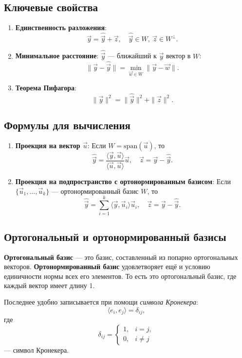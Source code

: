 \documentclass[12pt]{article}
\begin{document}
\subsection*{Ключевые свойства}
\begin{enumerate}
    \item \textbf{Единственность разложения}:  
    $$
    \vec{y} = \hat{\vec{y}} + \vec{z}, \quad \hat{\vec{y}} \in W, \ \vec{z} \in W^\perp.
    $$
    
    \item \textbf{Минимальное расстояние}:  
    $\hat{\vec{y}}$ — ближайший к $\vec{y}$ вектор в $W$:  
    $$
    \|\vec{y} - \hat{\vec{y}}\| = \min_{\vec{w} \in W} \|\vec{y} - \vec{w}\|.
    $$
    
    \item \textbf{Теорема Пифагора}:  
    $$
    \|\vec{y}\|^2 = \|\hat{\vec{y}}\|^2 + \|\vec{z}\|^2.
    $$
\end{enumerate}

\subsection*{Формулы для вычисления}
\begin{enumerate}
    \item \textbf{Проекция на вектор $\vec{u}$}:  
    Если $W = \mathrm{span}(\vec{u})$, то  
    $$
    \hat{\vec{y}} = \frac{\langle \vec{y}, \vec{u} \rangle}{\langle \vec{u}, \vec{u} \rangle} \vec{u}, \quad \vec{z} = \vec{y} - \hat{\vec{y}}.
    $$
    
    \item \textbf{Проекция на подпространство с ортонормированным базисом}:  
    Если $\{\vec{u}_1, \dots, \vec{u}_k\}$ — ортонормированный базис $W$, то  
    $$
    \hat{\vec{y}} = \sum_{i=1}^k \langle \vec{y}, \vec{u}_i \rangle \vec{u}_i, \quad \vec{z} = \vec{y} - \hat{\vec{y}}.
    $$
\end{enumerate}

\subsection*{Ортогональный и ортонормированный базисы}
\textbf{Ортогональный базис} — это базис, составленный из попарно ортогональных векторов.  
\textbf{Ортонормированный базис} удовлетворяет ещё и условию единичности нормы всех его элементов. То есть это ортогональный базис, где каждый вектор имеет длину 1.

Последнее удобно записывается при помощи \textit{символа Кронекера}:
$$
\langle e_i, e_j \rangle = \delta_{ij},
$$
где  
$$
\delta_{ij} = 
\begin{cases} 
1, & i = j, \\ 
0, & i \neq j 
\end{cases}
$$
— символ Кронекера.  
\end{document}
